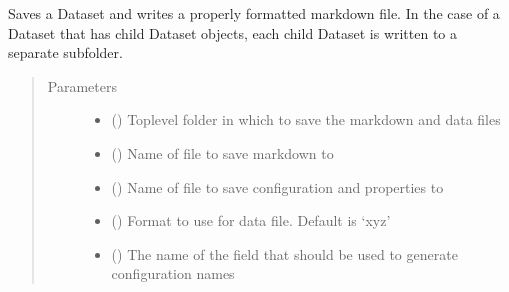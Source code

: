 \documentclass[letterpaper,10pt,english]{sphinxmanual}
\begin{document}
\begin{fulllineitems}
\begin{fulllineitems}
\label{\detokenize{dataset:colabfit.tools.dataset.Dataset.to_markdown}}
\sphinxAtStartPar
Saves a Dataset and writes a properly formatted markdown file. In the
case of a Dataset that has child Dataset objects, each child Dataset
is written to a separate sub\sphinxhyphen{}folder.
\begin{quote}\begin{description}
\item[{Parameters}] \leavevmode\begin{itemize}
\item {} 
\sphinxAtStartPar
{} () \textendash{} Top\sphinxhyphen{}level folder in which to save the markdown and data files

\item {} 
\sphinxAtStartPar
{} () \textendash{} Name of file to save markdown to

\item {} 
\sphinxAtStartPar
{} () \textendash{} Name of file to save configuration and properties to

\item {} 
\sphinxAtStartPar
{} () \textendash{} Format to use for data file. Default is ‘xyz’

\item {} 
\sphinxAtStartPar
{} () \textendash{} The name of the field that should be used to generate
configuration names

\end{itemize}

\end{description}\end{quote}

\end{fulllineitems}


\begin{fulllineitems}
\label{\detokenize{dataset:colabfit.tools.dataset.Dataset.train_test_split}}
\end{fulllineitems}


\end{fulllineitems}
\end{document}

